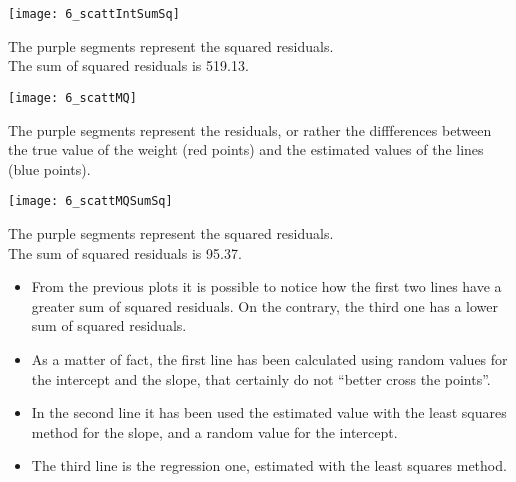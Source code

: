 \begin{frame}
  \begin{center}
    \texttt{[image: 6\_scattIntSumSq]}
  \end{center}
  \vspace{-0.4cm}
  \begin{small}
    The purple segments represent the squared residuals. \\
    The sum of squared residuals is 519.13.
  \end{small}
\end{frame}

\begin{frame}
  \begin{center}
    \texttt{[image: 6\_scattMQ]}
  \end{center}
  \vspace{-0.4cm}
  \begin{small}
    The purple segments represent the residuals, or rather the diffferences between the true value of the weight (red points) and the estimated values of the lines (blue points).
  \end{small}
\end{frame}

\begin{frame}
  \begin{center}
    \texttt{[image: 6\_scattMQSumSq]}
  \end{center}
  \vspace{-0.4cm}
  \begin{small}
    The purple segments represent the squared residuals. \\
    The sum of squared residuals is 95.37.
  \end{small}
\end{frame}

\begin{frame}
  \vspace{0.25cm}
  \begin{itemize}
    \item From the previous plots it is possible to notice how the first two lines have a greater sum of squared residuals. On the contrary, the third one has a lower sum of squared residuals.
    \vspace{0.20cm}
    \item As a matter of fact, the first line has been calculated using random values for the intercept and the slope, that certainly do not ``better cross the points''.
    \vspace{0.20cm}
    \item In the second line it has been used the estimated value with the least squares method for the slope, and a random value for the intercept.
    \vspace{0.20cm}
    \item The third line is the regression one, estimated with the least squares method.
  \end{itemize}
\end{frame}

